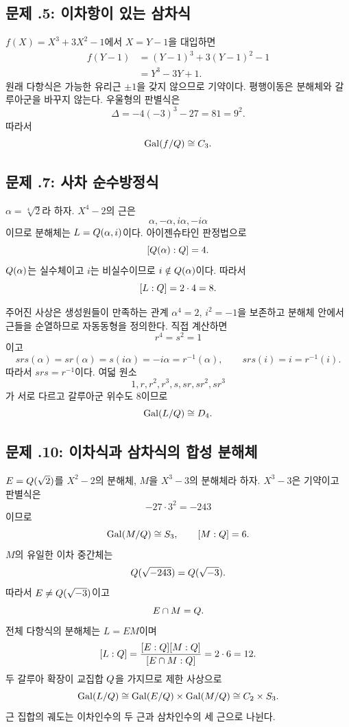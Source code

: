 \subsection*{문제 \thechapter.5: 이차항이 있는 삼차식}

\begin{solution}
$f(X)=X^3+3X^2-1$에서 $X=Y-1$을 대입하면
\[
\begin{aligned}
  f(Y-1)
  &=(Y-1)^3+3(Y-1)^2-1\\
  &=Y^3-3Y+1.
\end{aligned}
\]
원래 다항식은 가능한 유리근 $\pm1$을 갖지 않으므로 기약이다. 평행이동은 분해체와 갈루아군을 바꾸지 않는다. 우울형의 판별식은
\[
  \Delta=-4(-3)^3-27=81=9^2.
\]
따라서
\[
  \operatorname{Gal}(f/Q)\cong C_3.
\]
\end{solution}

\subsection*{문제 \thechapter.7: 사차 순수방정식}

\begin{solution}
$\alpha=\sqrt[4]{2}$라 하자. $X^4-2$의 근은
\[
  \alpha,-\alpha,i\alpha,-i\alpha
\]
이므로 분해체는 $L=Q(\alpha,i)$이다. 아이젠슈타인 판정법으로
\[
  [Q(\alpha):Q]=4.
\]
$Q(\alpha)$는 실수체이고 $i$는 비실수이므로 $i\notin Q(\alpha)$이다. 따라서
\[
  [L:Q]=2\cdot4=8.
\]

주어진 사상은 생성원들이 만족하는 관계 $\alpha^4=2$, $i^2=-1$을 보존하고 분해체 안에서 근들을 순열하므로 자동동형을 정의한다. 직접 계산하면
\[
  r^4=s^2=1
\]
이고
\[
  srs(\alpha)=s r(\alpha)=s(i\alpha)=-i\alpha=r^{-1}(\alpha),
  \qquad
  srs(i)=i=r^{-1}(i).
\]
따라서 $srs=r^{-1}$이다. 여덟 원소
\[
  1,r,r^2,r^3,s,sr,sr^2,sr^3
\]
가 서로 다르고 갈루아군 위수도 $8$이므로
\[
  \operatorname{Gal}(L/Q)\cong D_4.
\]
\end{solution}

\subsection*{문제 \thechapter.10: 이차식과 삼차식의 합성 분해체}

\begin{solution}
$E=Q(\sqrt2)$를 $X^2-2$의 분해체, $M$을 $X^3-3$의 분해체라 하자. $X^3-3$은 기약이고 판별식은
\[
  -27\cdot 3^2=-243
\]
이므로
\[
  \operatorname{Gal}(M/Q)\cong S_3,
  \qquad [M:Q]=6.
\]
$M$의 유일한 이차 중간체는
\[
  Q(\sqrt{-243})=Q(\sqrt{-3}).
\]
따라서 $E\ne Q(\sqrt{-3})$이고
\[
  E\cap M=Q.
\]
전체 다항식의 분해체는 $L=EM$이며
\[
  [L:Q]
  =\frac{[E:Q][M:Q]}{[E\cap M:Q]}
  =2\cdot6=12.
\]
두 갈루아 확장이 교집합 $Q$을 가지므로 제한 사상으로
\[
  \operatorname{Gal}(L/Q)
  \cong\operatorname{Gal}(E/Q)\times\operatorname{Gal}(M/Q)
  \cong C_2\times S_3.
\]
근 집합의 궤도는 이차인수의 두 근과 삼차인수의 세 근으로 나뉜다.
\end{solution}

